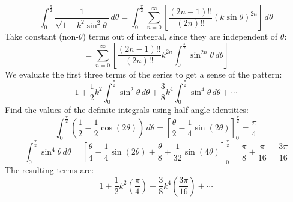 \documentclass[preview]{standalone}
\begin{document}
\color{white}
\[
  \int_{0}^{\frac{\pi}{2}} \frac{1}{\sqrt{1 - k^2
  \sin^2 \theta}} \, d\theta = \int_{0}^{\frac{\pi}{2}}
  \sum_{n=0}^{\infty} \left[\frac{ (2n-1)!!}{(2n)!!}
  {\left(k\sin\theta\right)}^{2n}\right] \, d\theta
\]
Take constant (non-$\theta$) terms out of integral, since they
are independent of $\theta$:
\[
  = \sum_{n=0}^{\infty} \left[\frac{ (2n-1)!!}{(2n)!!} k^{2n}
  \int_{0}^{\frac{\pi}{2}} \sin^{2n} \theta \, d\theta\right]
\]
We evaluate the first three terms of the series to get a sense of the pattern:
\[
  1 + \frac{1}{2}k^2\int_{0}^{\frac{\pi}{2}} \sin^2 \theta \, d\theta
  + \frac{3}{8}k^4\int_{0}^{\frac{\pi}{2}} \sin^4 \theta \, d\theta + \cdots
\]
Find the values of the definite integrals using half-angle identities:
\[
  \int_{0}^{\frac{\pi}{2}} \left(\frac{1}{2} -
  \frac{1}{2}\cos(2\theta)\right) \, d\theta = \left[\frac{\theta}{2}
  - \frac{1}{4}\sin(2\theta)\right]_{0}^{\frac{\pi}{2}} = \frac{\pi}{4}
\]
\[
  \int_{0}^{\frac{\pi}{2}} \sin^4 \theta \, d\theta =
  \left[\frac{\theta}{4} - \frac{1}{4}\sin(2\theta) +
    \frac{\theta}{8} +
  \frac{1}{32}\sin(4\theta)\right]_{0}^{\frac{\pi}{2}} =
  \frac{\pi}{8} + \frac{\pi}{16} = \frac{3\pi}{16}
\]
The resulting terms are:
\[
  1 + \frac{1}{2}k^2\left(\frac{\pi}{4}\right) +
  \frac{3}{8}k^4\left(\frac{3\pi}{16}\right) + \cdots
\]
\end{document}
